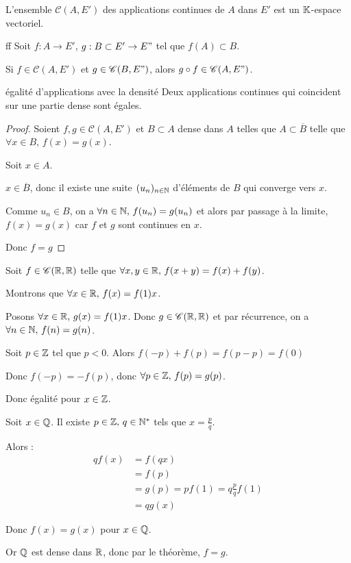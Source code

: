 
L'ensemble $\mathscr C(A, E')$ des applications continues de $A$ dans $E'$ est un $\mathbb{K}$-espace vectoriel.

\begin{theorement}{ff}{}
    Soit $f : A \to E'$, $g : B \subset E' \to E"$ tel que $f(A) \subset B$.

    Si $f \in \mathscr C(A, E')$ et $g \in \mathscr C(B, E")$, alors 
    $g \circ f \in \mathscr C(A, E")$.
\end{theorement}

\begin{theoreme}{égalité d'applications avec la densité}{}
    Deux applications continues qui coincident sur une partie dense sont égales. 
\end{theoreme}


\begin{proof}
    Soient $f, g \in \mathscr C(A, E')$ et $B \subset A$ dense dans $A$ telles que
    $A \subset \overline B$ telle que $\forall x \in B, \, f(x) = g(x)$.

    Soit $x \in A$. 

    $x \in \overline B$, donc il existe une suite $(u_n)_{n \in \mathbb{N}}$ d'éléments de $B$ qui converge vers $x$.
    
    Comme $u_n \in B$, on a $\forall n \in \mathbb{N}, \, f(u_n) = g(u_n)$ et alors par 
    passage à la limite, $f(x) = g(x)$ car $f$ et $g$ sont continues en $x$.

    Donc $f = g$
\end{proof}

\begin{exemple}
    Soit $f \in \mathscr C(\mathbb{R}, \mathbb{R})$ telle que $\forall x, y \in \mathbb{R}, \, f(x + y) = f(x) + f(y)$.

    Montrons que $\forall x \in \mathbb{R}, \, f(x) = f(1) x$.

    Posons $\forall x \in \mathbb{R}, \, g(x) = f(1) x$. Donc $g \in \mathscr C(\mathbb{R}, \mathbb{R})$ et 
    par récurrence, on a $\forall n \in \mathbb{N}, \, f(n) = g(n)$.

    Soit $p \in \mathbb{Z}$ tel que $p < 0$. Alors $f(-p) + f(p) = f(p - p) = f(0)$

    Donc $f(-p) = - f(p)$, donc $\forall p \in \mathbb{Z}, \, f(p) = g(p)$.

    Donc égalité pour $x \in \mathbb{Z}$. 

    Soit $x \in \mathbb{Q}$. Il existe $p \in \mathbb{Z}, \, q \in \mathbb{N}^*$ tels que $x = \frac p q$.

    Alors : 
    \begin{align*}
        qf(x) & = f(qx) \\
        & = f(p) \\
        & = g(p) = pf(1) = q \frac p q f(1) \\
        & = q g(x)
    \end{align*}

    Donc $f(x) = g(x)$ pour $x \in \mathbb{Q}$.

    Or $\mathbb{Q}$ est dense dans $\mathbb{R}$, donc par le théorème, $f = g$.
\end{exemple}

